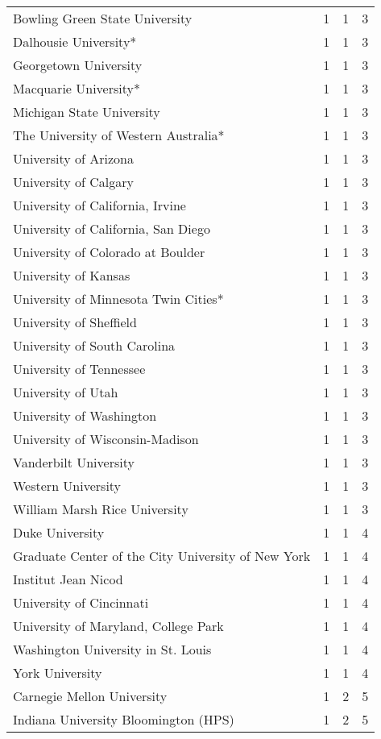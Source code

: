 \begin{longtable}[t]{llll}
\addlinespace
Bowling Green State University & 1 & 1 & 3\\
Dalhousie University* & 1 & 1 & 3\\
Georgetown University & 1 & 1 & 3\\
Macquarie University* & 1 & 1 & 3\\
Michigan State University & 1 & 1 & 3\\
\addlinespace
The University of Western Australia* & 1 & 1 & 3\\
University of Arizona & 1 & 1 & 3\\
University of Calgary & 1 & 1 & 3\\
University of California, Irvine & 1 & 1 & 3\\
University of California, San Diego & 1 & 1 & 3\\
\addlinespace
University of Colorado at Boulder & 1 & 1 & 3\\
University of Kansas & 1 & 1 & 3\\
University of Minnesota Twin Cities* & 1 & 1 & 3\\
University of Sheffield & 1 & 1 & 3\\
University of South Carolina & 1 & 1 & 3\\
\addlinespace
University of Tennessee & 1 & 1 & 3\\
University of Utah & 1 & 1 & 3\\
University of Washington & 1 & 1 & 3\\
University of Wisconsin-Madison & 1 & 1 & 3\\
Vanderbilt University & 1 & 1 & 3\\
\addlinespace
Western University & 1 & 1 & 3\\
William Marsh Rice University & 1 & 1 & 3\\
Duke University & 1 & 1 & 4\\
Graduate Center of the City University of New York & 1 & 1 & 4\\
Institut Jean Nicod & 1 & 1 & 4\\
\addlinespace
University of Cincinnati & 1 & 1 & 4\\
University of Maryland, College Park & 1 & 1 & 4\\
Washington University in St. Louis & 1 & 1 & 4\\
York University & 1 & 1 & 4\\
Carnegie Mellon University & 1 & 2 & 5\\
\addlinespace
Indiana University Bloomington (HPS) & 1 & 2 & 5\\

\end{longtable}
